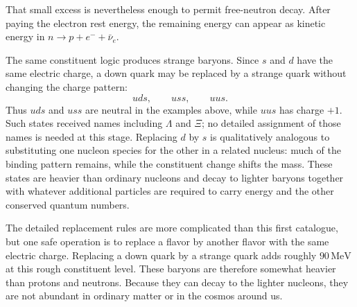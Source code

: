 \begin{classroomqa}
\end{classroomqa}

That small excess is nevertheless enough to permit free-neutron decay. After paying the electron rest energy, the remaining energy can appear as kinetic energy in \(n\to p+e^-+\bar\nu_e\).

The same constituent logic produces strange baryons. Since \(s\) and \(d\) have the same electric charge, a down quark may be replaced by a strange quark without changing the charge pattern:
\begin{equation}
uds,\qquad uss,\qquad uus.
\end{equation}
Thus \(uds\) and \(uss\) are neutral in the examples above, while \(uus\) has charge \(+1\). Such states received names including \(\Lambda\) and \(\Xi\); no detailed assignment of those names is needed at this stage. Replacing \(d\) by \(s\) is qualitatively analogous to substituting one nucleon species for the other in a related nucleus: much of the binding pattern remains, while the constituent change shifts the mass. These states are heavier than ordinary nucleons and decay to lighter baryons together with whatever additional particles are required to carry energy and the other conserved quantum numbers.

\begin{classroomqa}
\end{classroomqa}

The detailed replacement rules are more complicated than this first catalogue, but one safe operation is to replace a flavor by another flavor with the same electric charge. Replacing a down quark by a strange quark adds roughly \(90\,\mathrm{MeV}\) at this rough constituent level. These baryons are therefore somewhat heavier than protons and neutrons. Because they can decay to the lighter nucleons, they are not abundant in ordinary matter or in the cosmos around us.

\begin{classroomqa}
\end{classroomqa}

